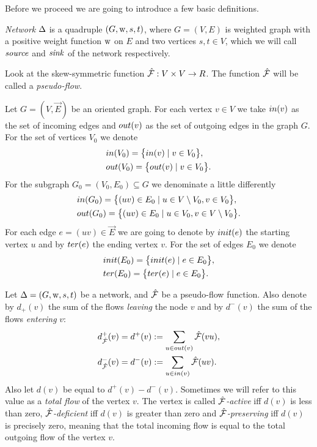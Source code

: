 \documentclass[12pt]{article}
\begin{document}
    Before we proceed we are going to introduce a few basic definitions.
    \begin{definition}
        \emph{Network} $\Delta$ is a quadruple $(G, \mathrm{w}, s, t)$, where $G = (V, E)$ is weighted graph 
        with a positive weight function $\mathrm{w}$ on $E$ and two vertices $s, t \in V$, which
        we will call $\mathit{source}$ and $\mathit{sink}$ of the network respectively.
    \end{definition}
    \begin{definition}
        Look at the skew-symmetric function $\mathcal{\hat{F}}: V \times V \to R$.
        The function $\mathcal{\hat{F}}$ will be called a \emph{pseudo-flow}.
    \end{definition}
    \begin{definition}
      Let $G = (V, \vec{E})$ be an oriented graph.
      For each vertex $v \in V$ we take $in(v)$ as the set of incoming edges
      and $out(v)$ as the set of outgoing edges in the graph $G$.
      For the set of vertices $V_0$ we denote
      \begin{align*}
        &in(V_0) = \big\{in(v) \mid v\in V_0\big\},\\
        &out(V_0) = \big\{out(v) \mid v\in V_0\big\}.
      \end{align*}
      For the subgraph $G_0 = (V_0, E_0) \subseteq G$ we denominate a little differently
      \begin{align*}
        &in(G_0) = \big\{(uv)\in E_0 \mid u \in V \setminus V_0, v \in V_0\big\},\\
        &out(G_0) = \big\{(uv) \in E_0 \mid u \in V_0, v \in V\setminus V_0\big\}.
      \end{align*}
      For each edge $e=(uv) \in \vec{E}$ we are going to denote by $init(e)$ the starting vertex
      $u$ and by $ter(e)$ the ending vertex $v$.
      For the set of edges $E_0$ we denote
      \begin{align*}
        &init(E_0) = \big\{init(e) \mid e\in E_0\big\},\\
        &ter(E_0) = \big\{ter(e) \mid e\in E_0\big\}.
      \end{align*}
    \end{definition}
    \begin{definition}
      Let $\Delta = (G, \mathrm{w}, s, t)$ be a network, and $\mathcal{\hat{F}}$ be a pseudo-flow function.
      Also denote by $d_{+}(v)$ the sum of the flows \emph{leaving} the node $v$ and by
      $d^{-}(v)$ the sum of the flows \emph{entering} $v$:
      \begin{align*}
        &d^{+}_{\mathcal{\hat{F}}}(v) = d^{+}(v) := \sum_{u \in out(v)} \mathcal{\hat{F}}(vu),\\
        &d^{-}_{\mathcal{\hat{F}}}(v) = d^{-}(v) := \sum_{u \in in(v)} \mathcal{\hat{F}}(uv).
      \end{align*}
      Also let $d(v)$ be equal to $d^{+}(v) - d^{-}(v)$. Sometimes we will refer to this value as
      a \emph{total flow} of the vertex $v$.
      The vertex is called \emph{$\mathcal{\hat{F}}$-active} iff $d(v)$ is less than zero,
      \emph{$\mathcal{\hat{F}}$-deficient} iff $d(v)$ is greater than zero and
      \emph{$\mathcal{\hat{F}}$-preserving} iff $d(v)$ is precisely zero, meaning that the total incoming flow
      is equal to the total outgoing flow of the vertex $v$.
    \end{definition}
\end{document}
